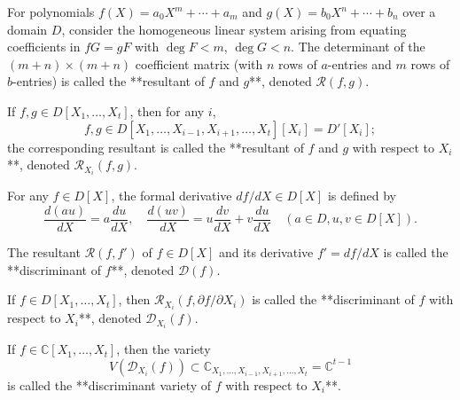 For polynomials $f(X) = a_0 X^m + \cdots + a_m$ and $g(X) = b_0 X^n + \cdots + b_n$ over a domain $D$, consider the homogeneous linear system arising from equating coefficients in $fG = gF$ with $\deg F < m$, $\deg G < n$. The determinant of the $(m+n) \times (m+n)$ coefficient matrix (with $n$ rows of $a$-entries and $m$ rows of $b$-entries) is called the **resultant of $f$ and $g$**, denoted $\mathcal{R}(f, g)$.

If $f, g \in D[X_1, \ldots, X_t]$, then for any $i$,
$$f, g \in D[X_1, \ldots, X_{i-1}, X_{i+1}, \ldots, X_t][X_i] = D'[X_i];$$
the corresponding resultant is called the **resultant of $f$ and $g$ with respect to $X_i$**, denoted $\mathcal{R}_{X_i}(f, g)$.

For any $f \in D[X]$, the formal derivative $df/dX \in D[X]$ is defined by
$$\frac{d(au)}{dX} = a \frac{du}{dX}, \quad \frac{d(uv)}{dX} = u \frac{dv}{dX} + v \frac{du}{dX} \quad (a \in D, u, v \in D[X]).$$

The resultant $\mathcal{R}(f, f')$ of $f \in D[X]$ and its derivative $f' = df/dX$ is called the **discriminant of $f$**, denoted $\mathcal{D}(f)$.

If $f \in D[X_1, \ldots, X_t]$, then $\mathcal{R}_{X_i}(f, \partial f/\partial X_i)$ is called the **discriminant of $f$ with respect to $X_i$**, denoted $\mathcal{D}_{X_i}(f)$.

If $f \in \mathbb{C}[X_1, \ldots, X_t]$, then the variety
$$V(\mathcal{D}_{X_i}(f)) \subset \mathbb{C}_{X_1, \ldots, X_{i-1}, X_{i+1}, \ldots, X_t} = \mathbb{C}^{t-1}$$
is called the **discriminant variety of $f$ with respect to $X_i$**.
